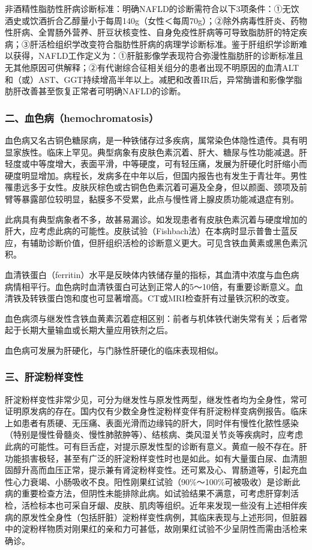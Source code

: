 非酒精性脂肪性肝病诊断标准：明确NAFLD的诊断需符合以下3项条件：①无饮酒史或饮酒折合乙醇量小于每周140g（女性＜每周70g）；②除外病毒性肝炎、药物性肝病、全胃肠外营养、肝豆状核变性、自身免疫性肝病等可导致脂肪肝的特定疾病；③肝活检组织学改变符合脂肪性肝病的病理学诊断标准。鉴于肝组织学诊断难以获得，NAFLD工作定义为：①肝脏影像学表现符合弥漫性脂肪肝的诊断标准且无其他原因可供解释；②有代谢综合征相关组分的患者出现不明原因的血清ALT和（或）AST、GGT持续增高半年以上。减肥和改善IR后，异常酶谱和影像学脂肪肝改善甚至恢复正常者可明确NAFLD的诊断。

\subsubsection{二、血色病（hemochromatosis）}

血色病又名古铜色糖尿病，是一种铁储存过多疾病，属常染色体隐性遗传。具有明显家族性。临床上罕见。典型病象有皮肤色素沉着、肝大、糖尿与性功能减退。肝轻度或中等度增大，表面平滑，中等硬度，可有轻压痛，发展为肝硬化时肝缩小而硬度明显增加。病程长，发病多在中年以后，但国内报告也有发生于青壮年。男性罹患远多于女性。皮肤灰棕色或古铜色色素沉着可遍及全身，但以颜面、颈项及前臂等暴露部位较明显，黏膜多不受累，此点与慢性肾上腺皮质功能减退症有别。

此病具有典型病象者不多，故甚易漏诊。如发现患者有皮肤色素沉着与硬度增加的肝大，应考虑此病的可能性。皮肤试验（Fishbach法）在本病时显示普鲁士蓝反应，有辅助诊断价值，但肝组织活检的诊断意义更大。可见含铁血黄素或黑色素沉积。

血清铁蛋白（ferritin）水平是反映体内铁储存量的指标，其血清中浓度与血色病病情相平行。血色病时血清铁蛋白可达到正常人的5～10倍，有重要诊断意义。血清铁及转铁蛋白饱和度也可显著增高。CT或MRI检查肝有过量铁沉积的改变。

血色病须与继发性含铁血黄素沉着症相区别：前者与机体铁代谢失常有关；后者常起于长期大量输血或长期大量应用铁剂之后。

血色病可发展为肝硬化，与门脉性肝硬化的临床表现相似。

\subsubsection{三、肝淀粉样变性}

肝淀粉样变性非常少见，可分为继发性与原发性两型，继发性者均为全身性，常可证明原发病的存在。国内仅有少数全身性淀粉样变伴有肝淀粉样变病例报告。临床上如患者有质硬、无压痛、表面光滑而边缘钝的肝大，同时伴有慢性化脓性感染（特别是慢性骨髓炎、慢性肺脓肿等）、结核病、类风湿关节炎等疾病时，应考虑此病的可能性。可有巨舌症，对提示原发性型的诊断有意义。黄疸一般不存在。肝功能损害极轻，甚至有广泛的肝淀粉样变性时也是如此。如有大量蛋白尿、血清胆固醇升高而血压正常，提示兼有肾淀粉样变性。还可累及心、胃肠道等，引起充血性心力衰竭、小肠吸收不良。阳性刚果红试验（90\%～100\%可被吸收）是诊断此病的重要检查方法，但阴性未能排除此病。如试验结果不满意，可考虑肝穿刺活检，活检标本也可采自牙龈、皮肤、肌肉等组织。近年来发现一些没有上述相伴疾病的原发性全身性（包括肝脏）淀粉样变性病例，其临床表现与上述形同，但脏器中的淀粉样物质对刚果红的亲和力可甚低，故刚果红试验不少呈阴性而需由活检来确诊。

